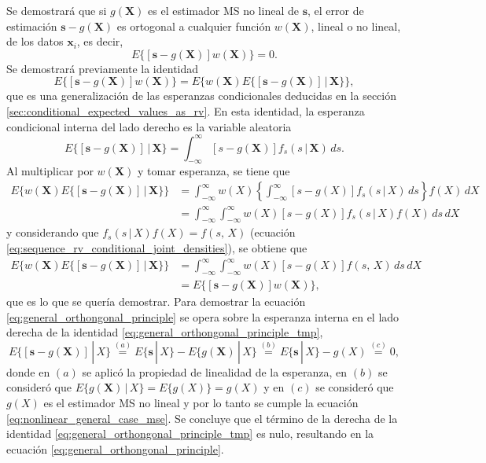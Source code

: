 \documentclass[a4paper]{report}
\newcommand{\X}{\mathbf{X}}
\newcommand{\x}{\mathbf{x}}
\newcommand{\s}{\mathbf{s}}
\begin{document}
Se demostrará que si \(g(\X)\) es el estimador MS no lineal de \(\s\), el error de estimación \(\s-g(\X)\) es ortogonal a cualquier función \(w(\X)\), lineal o no lineal, de los datos \(\x_i\), es decir,
\begin{equation}\label{eq:general_orthongonal_principle}
  E\{[\s-g(\X)]w(\X)\}=0.
\end{equation}
Se demostrará previamente la identidad
\begin{equation}\label{eq:general_orthongonal_principle_tmp}
  E\{[\s-g(\X)]w(\X)\}=E\{w(\X)E\{[\s-g(\X)]\,|\,\X\}\},
\end{equation}
que es una generalización de las esperanzas condicionales deducidas en la sección \ref{sec:conditional_expected_values_as_rv}. En esta identidad, la esperanza condicional interna del lado derecho es la variable aleatoria
\[
 E\{[\s-g(\X)]\,|\,\X\}=\int_{-\infty}^{\infty}[s-g(\X)]f_s(s\,|\,\X)\,ds.
\]
Al multiplicar por \(w(\X)\) y tomar esperanza, se tiene que
\begin{align*}
 E\{w(\X)E\{[\s-g(\X)]\,|\,\X\}\}&=\int_{-\infty}^{\infty}w(X)\left\{\int_{-\infty}^{\infty}[s-g(X)]f_s(s\,|\,X)\,ds\right\}f(X)\,dX\\
 &=\int_{-\infty}^{\infty}\int_{-\infty}^{\infty}w(X)[s-g(X)]f_s(s\,|\,X)f(X)\,ds\,dX
\end{align*}
y considerando que \(f_s(s\,|\,X)f(X)=f(s,\,X)\) (ecuación \ref{eq:sequence_rv_conditional_joint_densities}), se obtiene que
\begin{align*}
 E\{w(\X)E\{[\s-g(\X)]\,|\,\X\}\}&=\int_{-\infty}^{\infty}\int_{-\infty}^{\infty}w(X)[s-g(X)]f(s,\,X)\,ds\,dX\\
 &=E\{[\s-g(\X)]w(\X)\},
\end{align*}
que es lo que se quería demostrar. Para demostrar la ecuación \ref{eq:general_orthongonal_principle} se opera sobre la esperanza interna en el lado derecha de la identidad \ref{eq:general_orthongonal_principle_tmp},
\[
 E\{[\s-g(\X)]\,|\,X\}\overset{(a)}{=}E\{\s\,|\,X\}-E\{g(\X)\,|\,X\}
 \overset{(b)}{=}E\{\s\,|\,X\}-g(X)\overset{(c)}{=}0,
\]
donde en \((a)\) se aplicó la propiedad de linealidad de la esperanza, en \((b)\) se consideró que \(E\{g(\X)\,|\,X\}=E\{g(X)\}=g(X)\) y en \((c)\) se consideró que \(g(X)\) es el estimador MS no lineal y por lo tanto se cumple la ecuación \ref{eq:nonlinear_general_case_mse}. Se concluye que el término de la derecha de la identidad \ref{eq:general_orthongonal_principle_tmp} es nulo, resultando en la ecuación \ref{eq:general_orthongonal_principle}.
\end{document}
